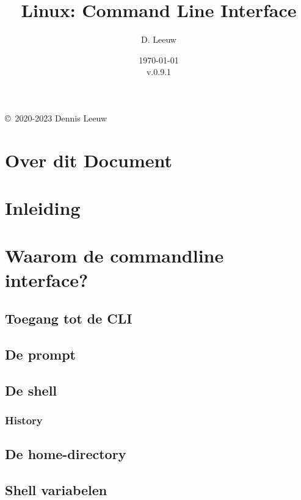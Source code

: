 \documentclass[a4paper,12pt,twoside,openright,titlepage]{book}
\author{D. Leeuw}
\title{Linux: Command Line Interface}
\date{\today\\v.0.9.1}
\begin{document}

\maketitle

\copyright\ 2020-2023 Dennis Leeuw\\




\frontmatter
\chapter{Over dit Document}



\tableofcontents

\mainmatter
\chapter{Inleiding}


\chapter{Waarom de commandline interface?}

\section{Toegang tot de CLI}

\section{De prompt}

\section{De shell}

\subsection{History}

\section{De home-directory}

\section{Shell variabelen}

\end{document}
